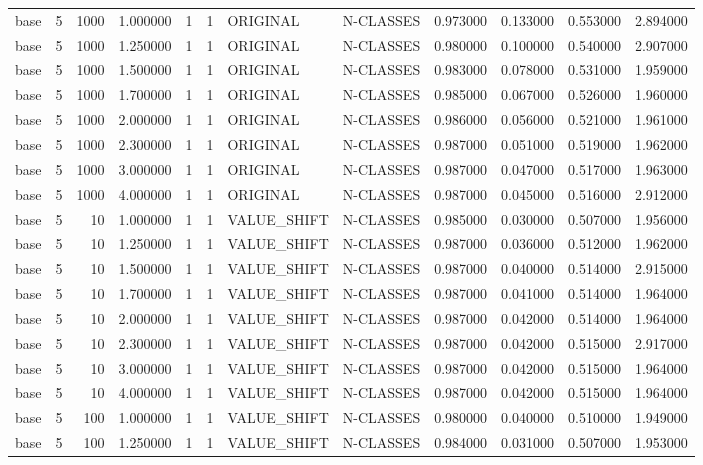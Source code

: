 \begin{tabular}{lrrrllllrrrr}
base & 5 & 1000 & 1.000000 & 1 & 1 & ORIGINAL & N-CLASSES & 0.973000 & 0.133000 & 0.553000 & 2.894000 \\
base & 5 & 1000 & 1.250000 & 1 & 1 & ORIGINAL & N-CLASSES & 0.980000 & 0.100000 & 0.540000 & 2.907000 \\
base & 5 & 1000 & 1.500000 & 1 & 1 & ORIGINAL & N-CLASSES & 0.983000 & 0.078000 & 0.531000 & 1.959000 \\
base & 5 & 1000 & 1.700000 & 1 & 1 & ORIGINAL & N-CLASSES & 0.985000 & 0.067000 & 0.526000 & 1.960000 \\
base & 5 & 1000 & 2.000000 & 1 & 1 & ORIGINAL & N-CLASSES & 0.986000 & 0.056000 & 0.521000 & 1.961000 \\
base & 5 & 1000 & 2.300000 & 1 & 1 & ORIGINAL & N-CLASSES & 0.987000 & 0.051000 & 0.519000 & 1.962000 \\
base & 5 & 1000 & 3.000000 & 1 & 1 & ORIGINAL & N-CLASSES & 0.987000 & 0.047000 & 0.517000 & 1.963000 \\
base & 5 & 1000 & 4.000000 & 1 & 1 & ORIGINAL & N-CLASSES & 0.987000 & 0.045000 & 0.516000 & 2.912000 \\
base & 5 & 10 & 1.000000 & 1 & 1 & VALUE_SHIFT & N-CLASSES & 0.985000 & 0.030000 & 0.507000 & 1.956000 \\
base & 5 & 10 & 1.250000 & 1 & 1 & VALUE_SHIFT & N-CLASSES & 0.987000 & 0.036000 & 0.512000 & 1.962000 \\
base & 5 & 10 & 1.500000 & 1 & 1 & VALUE_SHIFT & N-CLASSES & 0.987000 & 0.040000 & 0.514000 & 2.915000 \\
base & 5 & 10 & 1.700000 & 1 & 1 & VALUE_SHIFT & N-CLASSES & 0.987000 & 0.041000 & 0.514000 & 1.964000 \\
base & 5 & 10 & 2.000000 & 1 & 1 & VALUE_SHIFT & N-CLASSES & 0.987000 & 0.042000 & 0.514000 & 1.964000 \\
base & 5 & 10 & 2.300000 & 1 & 1 & VALUE_SHIFT & N-CLASSES & 0.987000 & 0.042000 & 0.515000 & 2.917000 \\
base & 5 & 10 & 3.000000 & 1 & 1 & VALUE_SHIFT & N-CLASSES & 0.987000 & 0.042000 & 0.515000 & 1.964000 \\
base & 5 & 10 & 4.000000 & 1 & 1 & VALUE_SHIFT & N-CLASSES & 0.987000 & 0.042000 & 0.515000 & 1.964000 \\
base & 5 & 100 & 1.000000 & 1 & 1 & VALUE_SHIFT & N-CLASSES & 0.980000 & 0.040000 & 0.510000 & 1.949000 \\
base & 5 & 100 & 1.250000 & 1 & 1 & VALUE_SHIFT & N-CLASSES & 0.984000 & 0.031000 & 0.507000 & 1.953000 \\

\end{tabular}
